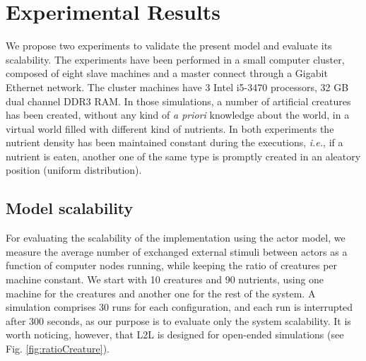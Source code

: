 \documentclass[runningheads]{llncs}
\begin{document}
\section{Experimental Results}
\label{sec:results}

We propose two experiments to validate the present model and evaluate its scalability. The experiments have been performed in a small computer cluster, composed of eight slave machines and a master connect through a Gigabit Ethernet network. The cluster machines have 3 Intel i5-3470 processors, 32 GB dual channel DDR3 RAM. In those simulations, a number of artificial creatures has been created, without any kind of \textit{a priori} knowledge about the world, in a virtual world filled with different kind of nutrients. In both experiments the nutrient density has been maintained constant during the executions, \textit{i.e.},  if a nutrient is eaten, another one of the same type is promptly created in an aleatory position (uniform distribution). 

\subsection{Model scalability}

For evaluating the scalability of the implementation using the actor model, we measure the average number of exchanged external stimuli between actors as a function of computer nodes running, while keeping the ratio of creatures per machine constant. We start with 10 creatures and 90 nutrients, using one machine for the creatures and another one for the rest of the system. A simulation comprises 30 runs for each configuration, and each run is interrupted after 300 seconds, as our purpose is to evaluate only the  system scalability. It is worth noticing, however, that L2L is designed for open-ended simulations (see  Fig. \ref{fig:ratioCreature}). 
\end{document}
